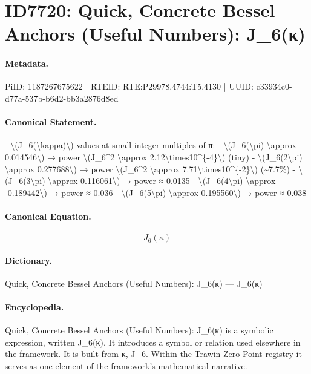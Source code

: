 \section*{ID7720: Quick, Concrete Bessel Anchors (Useful Numbers): J\_6(κ)}
\paragraph{Metadata.}
PiID: 1187267675622 | RTEID: RTE:P29978.4744:T5.4130 | UUID: c33934c0-d77a-537b-b6d2-bb3a2876d8ed

\paragraph{Canonical Statement.}
- \textbackslash{}(J\_6(\textbackslash{}kappa)\textbackslash{}) values at small integer multiples of π: - \textbackslash{}(J\_6(\textbackslash{}pi) \textbackslash{}approx 0.014546\textbackslash{}) → power \textbackslash{}(J\_6\textasciicircum{}2 \textbackslash{}approx 2.12\textbackslash{}times10\textasciicircum{}\{-4\}\textbackslash{}) (tiny) - \textbackslash{}(J\_6(2\textbackslash{}pi) \textbackslash{}approx 0.277688\textbackslash{}) → power \textbackslash{}(J\_6\textasciicircum{}2 \textbackslash{}approx 7.71\textbackslash{}times10\textasciicircum{}\{-2\}\textbackslash{}) (\textasciitilde{}7.7\%) - \textbackslash{}(J\_6(3\textbackslash{}pi) \textbackslash{}approx 0.116061\textbackslash{}) → power ≈ 0.0135 - \textbackslash{}(J\_6(4\textbackslash{}pi) \textbackslash{}approx -0.189442\textbackslash{}) → power ≈ 0.036 - \textbackslash{}(J\_6(5\textbackslash{}pi) \textbackslash{}approx 0.195560\textbackslash{}) → power ≈ 0.038

\paragraph{Canonical Equation.}
\[
J_6(\kappa)
\]

\paragraph{Dictionary.}
Quick, Concrete Bessel Anchors (Useful Numbers): J\_6(κ) — J\_6(κ)

\paragraph{Encyclopedia.}
Quick, Concrete Bessel Anchors (Useful Numbers): J\_6(κ) is a symbolic expression, written J\_6(κ). It introduces a symbol or relation used elsewhere in the framework. It is built from κ, J\_6. Within the Trawin Zero Point registry it serves as one element of the framework's mathematical narrative.
